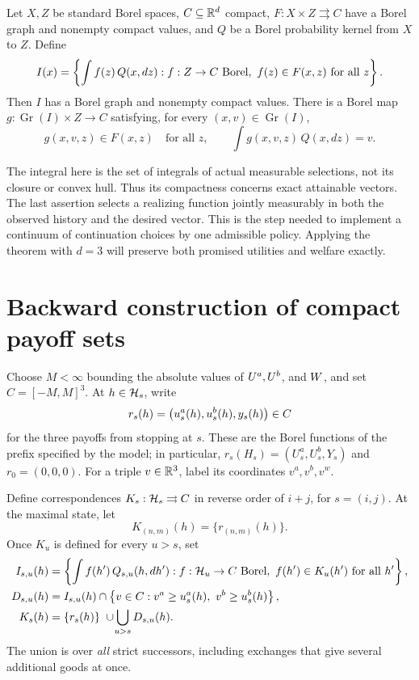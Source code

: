 \documentclass[11pt]{extarticle}
\begin{document}
\begin{theorem}\label{thm:selection}
Let $X,Z$ be standard Borel spaces, $C\subseteq\mathbb{R}^d$ compact,
$F:X\times Z\rightrightarrows C$ have a Borel graph and nonempty compact
values, and $Q$ be a Borel probability kernel from $X$ to $Z$. Define
\[
    I(x)=\left\{\int f(z)\,Q(x,dz):
                 f:Z\to C\text{ Borel},\ f(z)\in F(x,z)\text{ for all }z\right\}.
\]
Then $I$ has a Borel graph and nonempty compact values. There is a Borel
map $g:\operatorname{Gr}(I)\times Z\to C$ satisfying, for every
$(x,v)\in\operatorname{Gr}(I)$,
\[
    g(x,v,z)\in F(x,z)\quad\text{for all }z,\qquad
    \int g(x,v,z)\,Q(x,dz)=v.
\]
\end{theorem}

The integral here is the set of integrals of actual measurable
selections, not its closure or convex hull. Thus its compactness concerns
exact attainable vectors. The last assertion selects a realizing
function jointly measurably in both the observed history and the desired
vector. This is the step needed to implement a continuum of continuation
choices by one admissible policy. Applying the theorem with $d=3$ will
preserve both promised utilities and welfare exactly.

\section{Backward construction of compact payoff sets}

Choose $M<\infty$ bounding the absolute values of $U^a,U^b$, and
$W$, and set $C=[-M,M]^3$. At $h\in\mathcal{H}_s$, write
\[
    r_s(h)=\left(u_s^a(h),u_s^b(h),y_s(h)\right)\in C
\]
for the three payoffs from stopping at $s$. These are the Borel functions
of the prefix specified by the model; in particular,
$r_s(H_s)=(U_s^a,U_s^b,Y_s)$ and $r_0=(0,0,0)$.
For a triple $v\in\mathbb{R}^3$, label its coordinates $v^a,v^b,v^w$.

Define correspondences $K_s:\mathcal{H}_s\rightrightarrows C$ in reverse
order of $i+j$, for $s=(i,j)$. At the maximal state, let
\[
    K_{(n,m)}(h)=\{r_{(n,m)}(h)\}.
\]
Once $K_u$ is defined for every $u>s$, set
\begin{align}
    I_{s,u}(h)
    &=\left\{\int f(h')\,Q_{s,u}(h,dh'):
        f:\mathcal{H}_u\to C\text{ Borel},\ f(h')\in K_u(h')\text{ for all }h'\right\},
       \label{eq:I}\\
    D_{s,u}(h)
    &= I_{s,u}(h)\cap
       \left\{v\in C:v^a\geq u_s^a(h),\ v^b\geq u_s^b(h)\right\},
       \label{eq:D}\\
    K_s(h)
    &=\{r_s(h)\}\ \cup\!\bigcup_{u>s}D_{s,u}(h).
       \label{eq:K}
\end{align}
The union is over \emph{all} strict successors, including exchanges that
give several additional goods at once.
\end{document}
